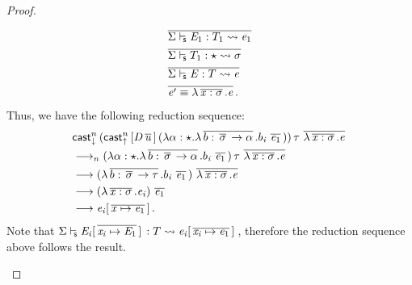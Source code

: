 \begin{proof}
\begin{description}
        \begin{align*}
                & \,\overline{   \Sigma  \vdash_{\!\!\mathsf{s} }  \mathit{E_{{\mathrm{1}}}}  :  T_{{\mathrm{1}}}   \rightsquigarrow   \mathit{e_{{\mathrm{1}}}}   }\, \\
                & \,\overline{   \Sigma  \vdash_{\!\!\mathsf{s} }  T_{{\mathrm{1}}}  :  \star   \rightsquigarrow   \sigma   }\, \\
                & \,\overline{   \Sigma  \vdash_{\!\!\mathsf{s} }  \mathit{E}  :  T   \rightsquigarrow   \mathit{e}   }\, \\
                & \,\overline{  \mathit{e'}  \equiv  \lambda  \,\overline{  \mathit{x}  :  \sigma  }\,  .  \mathit{e}  }\,.
        \end{align*}
        Thus, we have the following reduction sequence:
        \begin{align*}
            &\mathsf{cast}_{\downarrow}^n \, (  \mathsf{cast}_{\uparrow}^n \, [  \mathit{D}    \,\overline{  \mathit{u}  }\,  ] \,  (  \lambda  \alpha  :  \star  .  \lambda  \,\overline{  b  :  \,\overline{  \sigma  }\,  \rightarrow  \alpha  }\,  .  b_{\mathit{i}} \, \,\overline{  \mathit{e_{{\mathrm{1}}}}  }\,  )  ) \, \tau \, \,\overline{  \lambda  \,\overline{  \mathit{x}  :  \sigma  }\,  .  \mathit{e}  }\, \\
            & \longrightarrow_n   (  \lambda  \alpha  :  \star  .  \lambda  \,\overline{  b  :  \,\overline{  \sigma  }\,  \rightarrow  \alpha  }\,  .  b_{\mathit{i}} \, \,\overline{  \mathit{e_{{\mathrm{1}}}}  }\,  ) \, \tau \, \,\overline{  \lambda  \,\overline{  \mathit{x}  :  \sigma  }\,  .  \mathit{e}  }\, \\
            & \longrightarrow   (  \lambda  \,\overline{  b  :  \,\overline{  \sigma  }\,  \rightarrow  \tau  }\,  .  b_{\mathit{i}} \, \,\overline{  \mathit{e_{{\mathrm{1}}}}  }\,  ) \, \,\overline{  \lambda  \,\overline{  \mathit{x}  :  \sigma  }\,  .  \mathit{e}  }\,
\\
            & \longrightarrow   (  \lambda  \,\overline{  \mathit{x}  :  \sigma  }\,  .  \mathit{e_{\mathit{i}}}  ) \, \,\overline{  \mathit{e_{{\mathrm{1}}}}  }\, \\
            & \longrightarrow   \mathit{e_{\mathit{i}}}  [  \,\overline{  \mathit{x}  \mapsto  \mathit{e_{{\mathrm{1}}}}  }\,  ] \,.
        \end{align*}
        Note that $ \Sigma  \vdash_{\!\!\mathsf{s} }  \mathit{E_{\mathit{i}}}  [  \,\overline{  \mathit{x_{\mathit{i}}}  \mapsto  \mathit{E_{{\mathrm{1}}}}  }\,  ] \,  :  T   \rightsquigarrow   \mathit{e_{\mathit{i}}}  [  \,\overline{  \mathit{x_{\mathit{i}}}  \mapsto  \mathit{e_{{\mathrm{1}}}}  }\,  ] \, $, therefore the reduction sequence above follows the result.
    \end{description}
\end{proof}

